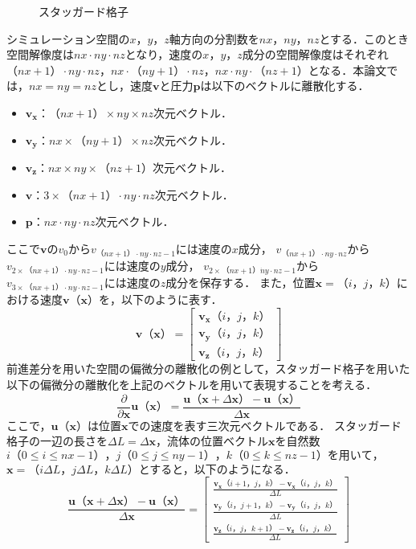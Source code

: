 \documentclass[a4j,12pt]{jreport}
\begin{document}
\begin{figure}[htbp]
\begin{center}
\caption{スタッガード格子}
\label{fig:staggerd}
\end{center}
\end{figure}

シミュレーション空間の$x$，$y$，$z$軸方向の分割数を$nx$，$ny$，$nz$とする．このとき空間解像度は$nx \cdot ny \cdot nz$となり，速度の$x，y，z$成分の空間解像度はそれぞれ$（nx+1） \cdot ny \cdot nz$，$nx \cdot （ny+1） \cdot nz$，$nx \cdot ny \cdot （nz+1）$となる．本論文では，$nx = ny =nz$とし，速度$\bm{v}$と圧力$\bm{p}$は以下のベクトルに離散化する．
\begin{itemize}
	\item	$\bm{v_x}$：$（nx+1） \times ny \times nz$次元ベクトル．
	\item	$\bm{v_y}$：$nx \times （ny+1） \times nz$次元ベクトル．
	\item	$\bm{v_z}$：$nx \times ny \times （nz+1）$次元ベクトル．
	\item	$\bm{v}$：$3\times（nx+1） \cdot ny \cdot nz $次元ベクトル．
	\item $\bm{p}$：$nx \cdot ny \cdot nz$次元ベクトル．
\end{itemize}
ここで$\bm{v}$の$v_0$から$v_{（nx+1） \cdot ny \cdot nz -1}$には速度の$x$成分，
$v_{（nx+1） \cdot ny \cdot nz }$から$v_{2\times（nx+1） \cdot ny \cdot nz - 1}$には速度の$y$成分，
$v_{2\times（nx+1） \dot ny \cdot nz - 1}$から$v_{3\times（nx+1） \cdot ny \cdot nz - 1}$には速度の$z$成分を保存する．
また，位置$\bm{x} =（i，j，k）$における速度$\bm{v} （\bm{x}）$を，以下のように表す．
\[
	\bm{v} （\bm{x}）= 
	 \begin{bmatrix}
		\bm{v_x}（i，j，k）\\
		\bm{v_y}（i，j，k）\\
		\bm{v_z}（i，j，k）
	\end{bmatrix}
\]
前進差分を用いた空間の偏微分の離散化の例として，スタッガード格子を用いた以下の偏微分の離散化を上記のベクトルを用いて表現することを考える．
\[
\frac{\partial}{\partial \bm{x}}\bm{u} （\bm{x}） = \frac{\bm{u}（\bm{x}+\varDelta \bm{x}）  - \bm{u} （\bm{x}） }{\varDelta \bm{x}}
\]
ここで，$\bm{u} （\bm{x}）$は位置$\bm{x}$での速度を表す三次元ベクトルである．
スタッガード格子の一辺の長さを$\varDelta L = \varDelta \bm{x}$，流体の位置ベクトル$\bm{x}$を自然数$i（0 \le i \le nx-1），j（0 \le j \le ny-1），k（0 \le k \le nz-1）を用いて，$$\bm{x} = （i\varDelta L，j\varDelta L，k\varDelta L）$とすると，以下のようになる．
\[
\frac{\bm{u}（\bm{x}+\varDelta \bm{x}）  - \bm{u} （\bm{x}） }{\varDelta \bm{x}}
= \begin{bmatrix}
\frac{\bm{v_x}（i+1，j，k）  - \bm{v_x} （i，j，k） }{\varDelta L}\\
\frac{\bm{v_y}（i，j+1，k）  - \bm{v_y} （i，j，k） }{\varDelta L}\\
\frac{\bm{v_z}（i，j，k+1）  - \bm{v_z} （i，j，k） }{\varDelta L}
\end{bmatrix}
\]
\end{document}
